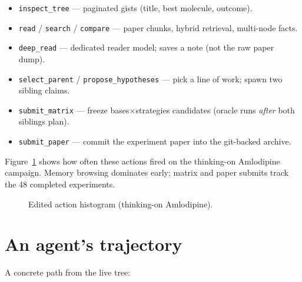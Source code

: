 \documentclass[11pt]{article}
\begin{document}
\begin{itemize}
  \item \texttt{inspect\_tree} --- paginated gists (title, best molecule, outcome).
  \item \texttt{read} / \texttt{search} / \texttt{compare} --- paper chunks, hybrid retrieval, multi-node facts.
  \item \texttt{deep\_read} --- dedicated reader model; saves a note (not the raw paper dump).
  \item \texttt{select\_parent} / \texttt{propose\_hypotheses} --- pick a line of work; spawn two sibling claims.
  \item \texttt{submit\_matrix} --- freeze bases$\times$strategies candidates (oracle runs \emph{after} both siblings plan).
  \item \texttt{submit\_paper} --- commit the experiment paper into the git-backed archive.
\end{itemize}

\noindent Figure~\ref{fig:actions} shows how often these actions fired on the thinking-on Amlodipine campaign. Memory browsing dominates early; matrix and paper submits track the 48 completed experiments.

\begin{figure}[t]
\centering
{}
\caption{Edited action histogram (thinking-on Amlodipine).}
\label{fig:actions}
\end{figure}

\section{An agent's trajectory}
A concrete path from the live tree:
\end{document}
